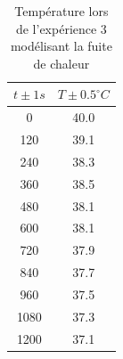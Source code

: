 \documentclass[12pt]{article}
\begin{document}
\begin{table}[h!]
	\begin{center}
		\begin{tabular}{|c|c|}
			\hline
			$t \pm 1 s$ & $T \pm 0.5^\circ C$ \\ \hline
			0 & 40.0    \\
			120 & 39.1 \\
			240 & 38.3 \\
			360 & 38.5 \\
			480 & 38.1 \\
			600 & 38.1 \\
			720 & 37.9 \\
			840 & 37.7 \\
			960 & 37.5 \\
			1080 & 37.3 \\
			1200 & 37.1 \\ \hline
		\end{tabular}
	\end{center}
	\caption{Température lors de l'expérience 3 modélisant la fuite de chaleur}
\end{table}
\end{document}
